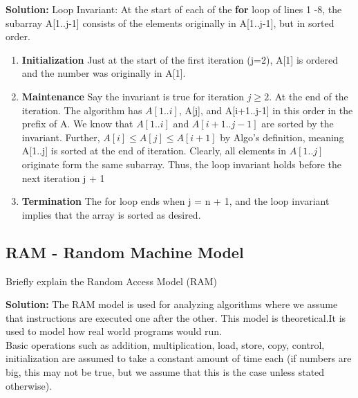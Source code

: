 \documentclass[11pt,fleqn]{book}
\begin{document}
\textbf{Solution:}
Loop Invariant: At the start of each of the \textbf{for} loop of lines 1 -8, the subarray A[1..j-1] consists of the elements originally in A[1..j-1], but in sorted order. 
\begin{enumerate}
    \item \textbf{Initialization} Just at the start of the first iteration (j=2), A[1] is ordered and the number was originally in A[1].
    \item \textbf{Maintenance} Say the invariant is true for iteration $j \geq 2$. At the end of the iteration. The algorithm has $A[1..i]$, A[j], and A[i+1..j-1] in this order in the prefix of A. We know that $A[1..i]$ and $A[i + 1..j-1]$ are sorted by the invariant. Further, $A[i] \leq A[j] \leq A[i + 1]$ by Algo's definition, meaning A[1..j] is sorted at the end of iteration. Clearly, all elements in $A[1..j]$ originate form the same subarray. Thus, the loop invariant holds before the next iteration j + 1
    \item \textbf{Termination} The for loop ends when j = n + 1, and the loop invariant implies that the array is sorted as desired. 
\end{enumerate}
\subsection{RAM - Random Machine Model} 
\begin{example}
Briefly explain the Random Access Model (RAM)
\end{example}
\textbf{Solution:}
The RAM model is used for analyzing algorithms where we assume  that instructions are executed one after the other. This model is theoretical.It is used to model how real world programs would run.\\
Basic operations such as addition, multiplication, load, store,
copy, control, initialization are assumed to take a constant
amount of time each (if numbers are big, this may not be true,
but we assume that this is the case unless stated otherwise).
\end{document}
